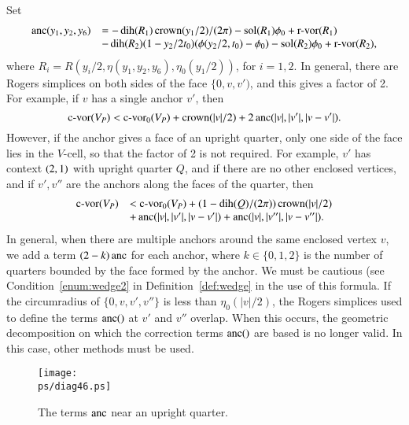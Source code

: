 Set
    \begin{equation}
    \begin{array}{lll}
    \operatorname{anc}(y_1,y_2,y_6) &= -\operatorname{dih}(R_1)\operatorname{crown}(y_1/2)/(2\pi)
        -\operatorname{sol}(R_1)\phi_0+{\operatorname{r-vor}}(R_1)\\
    &-\operatorname{dih}(R_2)(1-y_2/2t_0)(\phi(y_2/2,t_0)-\phi_0)
        -\operatorname{sol}(R_2)\phi_0 + {\operatorname{r-vor}}(R_2),
    \label{eqn:4.5}
    \end{array}
    \end{equation}
where $R_i=R(y_i/2,\eta(y_1,y_2,y_6),\eta_0(y_1/2))$, for $i=1,2$.
In general, there are Rogers simplices on both sides of the face
$\{0,v,v')$, and this gives a factor of 2. For example, if $v$ has
a single anchor $v'$, then
$${\operatorname{c-vor}}(V_P) < {\operatorname{c-vor}}_0(V_P) + \operatorname{crown}(|v|/2) + 2\operatorname{anc}(|v|,|v'|,|v-v'|).$$
However, if the anchor gives a face of an upright quarter, only
one side of the face lies in the $V$-cell,
 so that the factor of 2 is not required.
For example, $v'$ has context $\relax(2,1)$ with upright quarter $Q$,
and if there are no other enclosed vertices, and if $v',v''$ are
the anchors along the faces of the quarter,  then
    $$
    \begin{array}{lll}
    {\operatorname{c-vor}}(V_P)&< {\operatorname{c-vor}}_0(V_P) +(1-\operatorname{dih}(Q)/(2\pi))\operatorname{crown}(|v|/2)\\
    &+\operatorname{anc}(|v|,|v'|,|v-v'|)+\operatorname{anc}(|v|,|v''|,|v-v''|).
    \end{array}
    $$
In general, when there are multiple anchors around the same
enclosed vertex $v$, we add a term $(2-k)\operatorname{anc}$ for each anchor,
where $k\in\{0,1,2\}$ is the number of quarters bounded by the
face formed by the anchor. We must be cautious (see
Condition~\ref{enum:wedge2} in Definition~\ref{def:wedge} in the
use of this formula. If the circumradius of $\{0,v,v',v''\}$ is
less than $\eta_0(|v|/2)$, the Rogers simplices used to define the
terms $\operatorname{anc}()$ at $v'$ and $v''$ overlap. When this occurs, the
geometric decomposition on which the correction terms $\operatorname{anc}()$ are
based is no longer valid. In this case, other methods must be
used.

\begin{figure}[htb]
  \centering
  \texttt{[image: \\ps/diag46.ps]}
  \caption{The terms $\operatorname{anc}$ near an upright quarter.}
  \label{fig:anchor-quarter:bis}
\end{figure}


